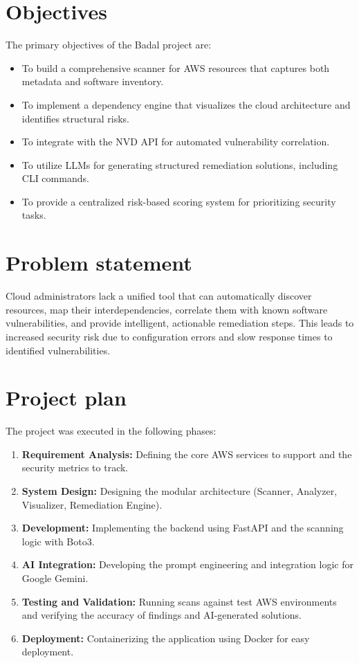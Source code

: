 \section{Objectives}
The primary objectives of the Badal project are:
\begin{itemize}
    \item To build a comprehensive scanner for AWS resources that captures both metadata and software inventory.
    \item To implement a dependency engine that visualizes the cloud architecture and identifies structural risks.
    \item To integrate with the NVD API for automated vulnerability correlation.
    \item To utilize LLMs for generating structured remediation solutions, including CLI commands.
    \item To provide a centralized risk-based scoring system for prioritizing security tasks.
\end{itemize}

\section{Problem statement}
Cloud administrators lack a unified tool that can automatically discover resources, map their interdependencies, correlate them with known software vulnerabilities, and provide intelligent, actionable remediation steps. This leads to increased security risk due to configuration errors and slow response times to identified vulnerabilities.

\section{Project plan}
The project was executed in the following phases:
\begin{enumerate}
    \item \textbf{Requirement Analysis:} Defining the core AWS services to support and the security metrics to track.
    \item \textbf{System Design:} Designing the modular architecture (Scanner, Analyzer, Visualizer, Remediation Engine).
    \item \textbf{Development:} Implementing the backend using FastAPI and the scanning logic with Boto3.
    \item \textbf{AI Integration:} Developing the prompt engineering and integration logic for Google Gemini.
    \item \textbf{Testing and Validation:} Running scans against test AWS environments and verifying the accuracy of findings and AI-generated solutions.
    \item \textbf{Deployment:} Containerizing the application using Docker for easy deployment.
\end{enumerate}
